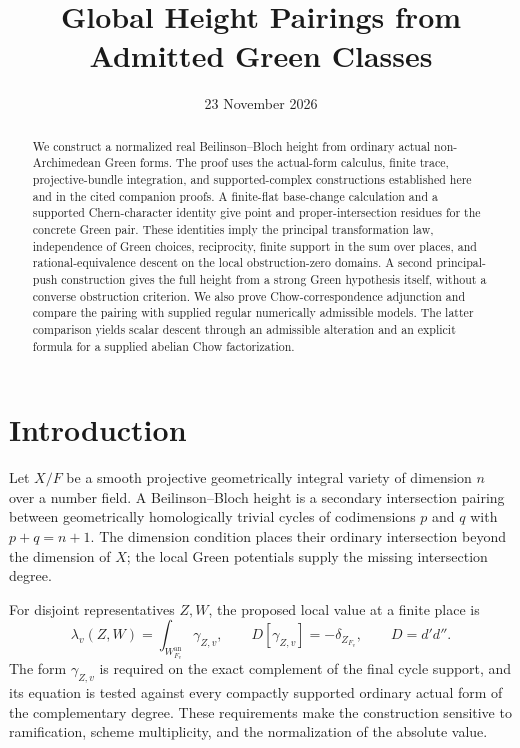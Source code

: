 \documentclass[11pt,a4paper]{article}
\title{Global Height Pairings from Admitted Green Classes}
\author{}
\date{23 November 2026}
\theoremstyle{definition}
\theoremstyle{remark}
\numberwithin{equation}{section}
\newcommand{\an}{\mathrm{an}}
\begin{document}
\maketitle
\begin{abstract}
We construct a normalized real Beilinson--Bloch height from ordinary actual non-Archimedean Green forms. The proof uses the actual-form calculus, finite trace, projective-bundle integration, and supported-complex constructions established here and in the cited companion proofs. A finite-flat base-change calculation and a supported Chern-character identity give point and proper-intersection residues for the concrete Green pair. These identities imply the principal transformation law, independence of Green choices, reciprocity, finite support in the sum over places, and rational-equivalence descent on the local obstruction-zero domains. A second principal-push construction gives the full height from a strong Green hypothesis itself, without a converse obstruction criterion. We also prove Chow-correspondence adjunction and compare the pairing with supplied regular numerically admissible models. The latter comparison yields scalar descent through an admissible alteration and an explicit formula for a supplied abelian Chow factorization.
\end{abstract}

\tableofcontents

\section{Introduction}\label{sec:height-introduction}

Let $X/F$ be a smooth projective geometrically integral variety of dimension $n$ over a number field. A Beilinson--Bloch height is a secondary intersection pairing between geometrically homologically trivial cycles of codimensions $p$ and $q$ with $p+q=n+1$. The dimension condition places their ordinary intersection beyond the dimension of $X$; the local Green potentials supply the missing intersection degree.

For disjoint representatives $Z,W$, the proposed local value at a finite place is
\[
 \lambda_v(Z,W)=\int_{W_{F_v}^{\an}}\gamma_{Z,v},
 \qquad D[\gamma_{Z,v}]=-\delta_{Z_{F_v}},\qquad D=d'd''.
\]
The form $\gamma_{Z,v}$ is required on the exact complement of the final cycle support, and its equation is tested against every compactly supported ordinary actual form of the complementary degree. These requirements make the construction sensitive to ramification, scheme multiplicity, and the normalization of the absolute value.
\end{document}

